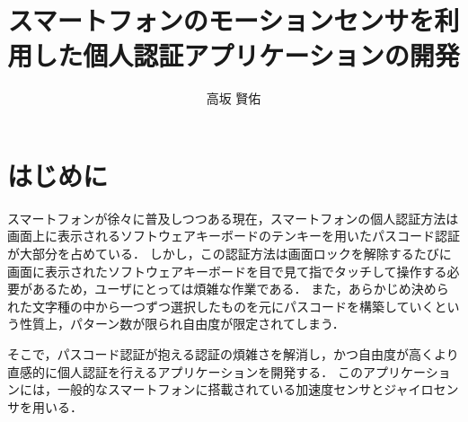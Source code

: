 \documentclass[11pt]{jarticle}
\title{スマートフォンのモーションセンサを利用した個人認証アプリケーションの開発}
\author{高坂 賢佑}
\begin{document}
\maketitle

\section{はじめに}
スマートフォンが徐々に普及しつつある現在，スマートフォンの個人認証方法は画面上に表示されるソフトウェアキーボードのテンキーを用いたパスコード認証が大部分を占めている．
しかし，この認証方法は画面ロックを解除するたびに画面に表示されたソフトウェアキーボードを目で見て指でタッチして操作する必要があるため，ユーザにとっては煩雑な作業である．
また，あらかじめ決められた文字種の中から一つずつ選択したものを元にパスコードを構築していくという性質上，パターン数が限られ自由度が限定されてしまう．

そこで，パスコード認証が抱える認証の煩雑さを解消し，かつ自由度が高くより直感的に個人認証を行えるアプリケーションを開発する．
このアプリケーションには，一般的なスマートフォンに搭載されている加速度センサとジャイロセンサを用いる．
\end{document}
